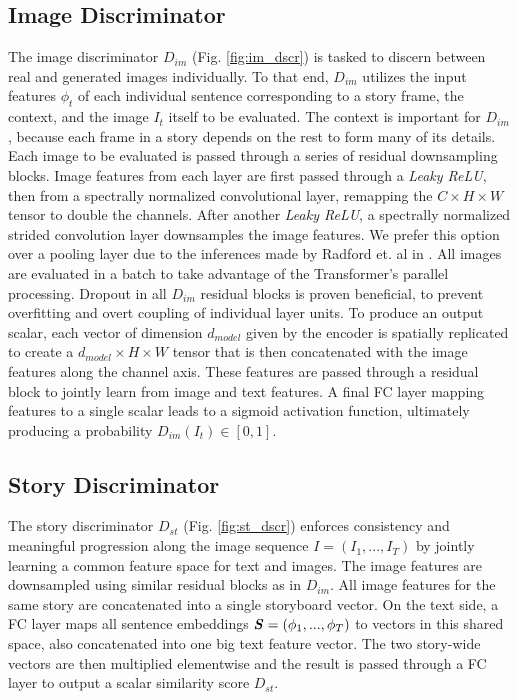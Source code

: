 \documentclass{article}
\begin{document}
\subsection{Image Discriminator}
The image discriminator $D_{im}$ (Fig. \ref{fig:im_dscr}) is tasked to discern between real and generated images individually. To that end, $D_{im}$ utilizes the input features $\phi_t$ of each individual sentence corresponding to a story frame, the context, and the image $I_t$ itself to be evaluated. The context is important for $D_{im}$, because each frame in a story depends on the rest to form many of its details. 
Each image to be evaluated is passed through a series of residual downsampling blocks. 
Image features from each layer are first passed through a \textit{Leaky ReLU}, then from a spectrally normalized convolutional layer, remapping the $C \times H \times W $ tensor to double the channels. 
After another \textit{Leaky ReLU}, a spectrally normalized strided convolution layer downsamples the image features. 
We prefer this option over a pooling layer due to the inferences made by Radford et. al in \cite{radford2016unsupervised}. 
All images are evaluated in a batch to take advantage of the Transformer's parallel processing. Dropout in all $D_{im}$ residual blocks is proven beneficial, 
to prevent overfitting and overt coupling of individual layer units. 
To produce an output scalar, each vector of dimension $d_{model}$ given by the encoder is spatially replicated to create a 
$d_{model} \times H \times W$ tensor that is then concatenated with the image features along the channel axis.  
These features are passed through a residual block to jointly learn from image and text features. A final FC layer mapping features to a single scalar leads to a sigmoid activation function, ultimately producing a probability $D_{im}(I_t) \in [0, 1]$.

\subsection{Story Discriminator}
The story discriminator $D_{st}$ (Fig. \ref{fig:st_dscr}) enforces consistency and meaningful progression along the image sequence $I=(I_1, ... , I_T)$ by jointly learning a common feature space for text and images. The image features are downsampled using similar residual blocks as in $D_{im}$. All image features for the same story are concatenated into a single storyboard vector. On the text side, a FC layer maps all sentence embeddings $\textbf{\textit{S}}=(\phi_1, . . . , \phi_T)$ to vectors in this shared space, also concatenated into one big text feature vector. The two story-wide vectors are then multiplied
elementwise and the result is passed through a FC layer to output a scalar similarity score $D_{st}$.
\end{document}

